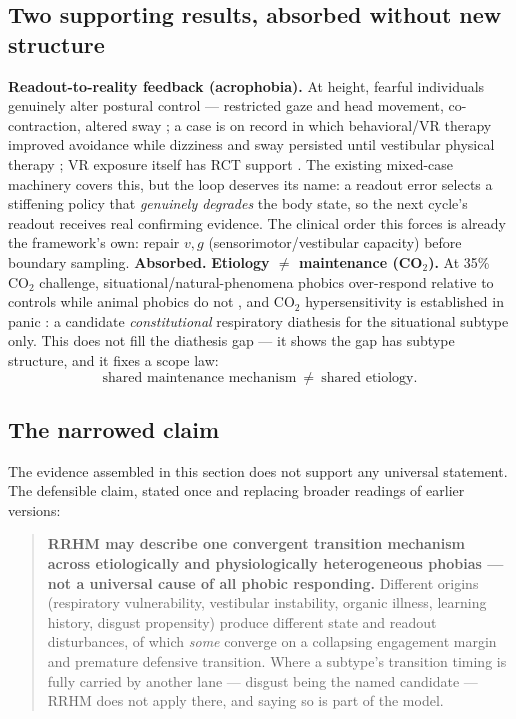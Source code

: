 \documentclass[9pt,twocolumn]{article}
\begin{document}
\subsection{Two supporting results, absorbed without new structure}
\textbf{Readout-to-reality feedback (acrophobia).} At height, fearful individuals genuinely alter postural control --- restricted gaze and head movement, co-contraction, altered sway \cite{kugler2015,cleworth2021}; a case is on record in which behavioral/VR therapy improved avoidance while dizziness and sway persisted until vestibular physical therapy \cite{whitney2005}; VR exposure itself has RCT support \cite{donker2025}. The existing mixed-case machinery covers this, but the loop deserves its name: a readout error selects a stiffening policy that \emph{genuinely degrades} the body state, so the next cycle's readout receives real confirming evidence. The clinical order this forces is already the framework's own: repair $v,g$ (sensorimotor/vestibular capacity) before boundary sampling. \textbf{Absorbed.} \quad \textbf{Etiology $\neq$ maintenance (CO$_2$).} At 35\% CO$_2$ challenge, situational/natural-phenomena phobics over-respond relative to controls while animal phobics do not \cite{verburg1994}, and CO$_2$ hypersensitivity is established in panic \cite{vollmer2013}: a candidate \emph{constitutional} respiratory diathesis for the situational subtype only. This does not fill the diathesis gap --- it shows the gap has subtype structure, and it fixes a scope law:
\[
\boxed{\text{shared maintenance mechanism}\ \neq\ \text{shared etiology}.}
\]

\subsection{The narrowed claim}
The evidence assembled in this section does not support any universal statement. The defensible claim, stated once and replacing broader readings of earlier versions:
\begin{quote}
\textbf{RRHM may describe one convergent transition mechanism across etiologically and physiologically heterogeneous phobias --- not a universal cause of all phobic responding.} Different origins (respiratory vulnerability, vestibular instability, organic illness, learning history, disgust propensity) produce different state and readout disturbances, of which \emph{some} converge on a collapsing engagement margin and premature defensive transition. Where a subtype's transition timing is fully carried by another lane --- disgust being the named candidate --- RRHM does not apply there, and saying so is part of the model.
\end{quote}
\end{document}
